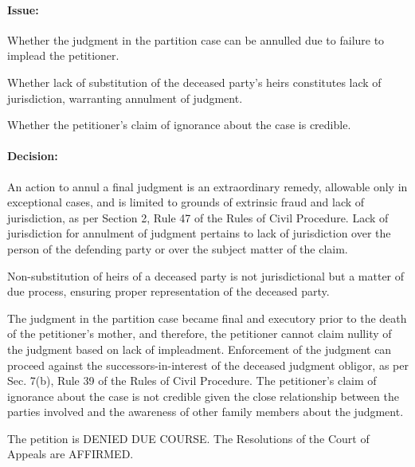 \documentclass[
12pt,
oneside,
onehalfspacing,
headsepline
]{DigestCollection}
\begin{document}
\paragraph{Issue:}
\label{0efc9ff0-1252-11ef-aa24-9916ea601717}


Whether the judgment in the partition case can be annulled due to failure to implead the petitioner.

Whether lack of substitution of the deceased party's heirs constitutes lack of jurisdiction, warranting annulment of judgment.

Whether the petitioner's claim of ignorance about the case is credible.

\paragraph{Decision:}
\label{11031e50-1252-11ef-aa24-9916ea601717}


An action to annul a final judgment is an extraordinary remedy, allowable only in exceptional cases, and is limited to grounds of extrinsic fraud and lack of jurisdiction, as per Section 2, Rule 47 of the Rules of Civil Procedure. Lack of jurisdiction for annulment of judgment pertains to lack of jurisdiction over the person of the defending party or over the subject matter of the claim.

Non-substitution of heirs of a deceased party is not jurisdictional but a matter of due process, ensuring proper representation of the deceased party.

The judgment in the partition case became final and executory prior to the death of the petitioner's mother, and therefore, the petitioner cannot claim nullity of the judgment based on lack of impleadment. Enforcement of the judgment can proceed against the successors-in-interest of the deceased judgment obligor, as per Sec. 7(b), Rule 39 of the Rules of Civil Procedure. The petitioner's claim of ignorance about the case is not credible given the close relationship between the parties involved and the awareness of other family members about the judgment.

The petition is DENIED DUE COURSE. The Resolutions of the Court of Appeals are AFFIRMED.
\end{document}
